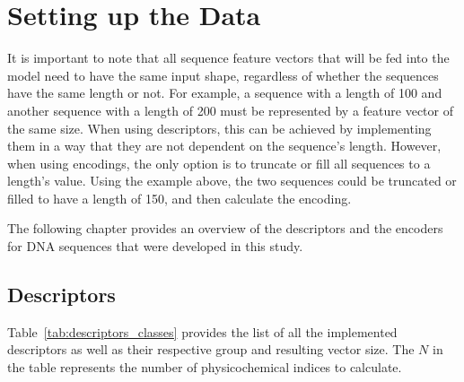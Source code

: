 \section{Setting up the Data}

It is important to note that all sequence feature vectors that will be fed into the model need to have the same input shape, regardless of whether the sequences have the same length or not. For example, a sequence with a length of 100 and another sequence with a length of 200 must be represented by a feature vector of the same size. When using descriptors, this can be achieved by implementing them in a way that they are not dependent on the sequence's length. However, when using encodings, the only option is to truncate or fill all sequences to a length's value. Using the example above, the two sequences could be truncated or filled to have a length of 150, and then calculate the encoding.

The following chapter provides an overview of the descriptors and the encoders for \gls{DNA} sequences that were developed in this study.

\subsection{Descriptors}\label{cha:descriptors}

Table~\ref{tab:descriptors_classes} provides the list of all the implemented descriptors as well as their respective group and resulting vector size. The $N$ in the table represents the number of physicochemical indices to calculate.


